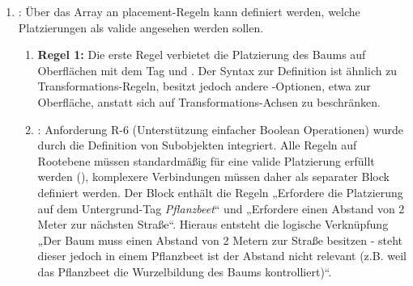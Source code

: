 \begin{enumerate}
\begin{enumerate}
        Schließlich kann über die Attribute  und  eine Begründung hinzugefügt werden. Ein zentraler Aspekt der Regelsyntax sind , welche modular zu einem zusammenhängenden Satz kombiniert werden können. Die atomaren Fehler müssen hierbei im Format  formatiert werden, z.B.  und . Bei mehreren auftretenden Fehlern können diese einzelnen atomaren Fehler schließlich zu einer vollständigen Information zusammengefügt werden, z.B. . Alternativ können über den  auch  definiert werden, falls keine Kombination gewünscht ist.
        \item \textbf{Regel 3}: Die dritte Regel definiert zusätzlich eine Einschränkung der Skalierung zwischen 0,5x und 1,5x
    \end{enumerate}
    \item {}: Über das Array an placement-Regeln kann definiert werden, welche Platzierungen als valide angesehen werden sollen.
    \begin{enumerate}
        \item \textbf{Regel 1:} Die erste Regel verbietet die Platzierung des Baums auf Oberflächen mit dem Tag  und . Der Syntax zur Definition ist ähnlich zu Transformations-Regeln, besitzt jedoch andere -Optionen, etwa zur Oberfläche, anstatt sich auf Transformations-Achsen zu beschränken.
        \item {}: Anforderung R-6 (Unterstützung einfacher Boolean Operationen) wurde durch die Definition von Subobjekten integriert. Alle Regeln auf Rootebene müssen standardmäßig für eine valide Platzierung erfüllt werden (), komplexere Verbindungen müssen daher als separater Block definiert werden.
        Der Block enthält die Regeln „Erfordere die Platzierung auf dem Untergrund-Tag \textit{Pflanzbeet}“ und „Erfordere einen Abstand von 2 Meter zur nächsten Straße“. Hieraus entsteht die logische Verknüpfung „Der Baum muss einen Abstand von 2 Metern zur Straße besitzen - steht dieser jedoch in einem Pflanzbeet ist der Abstand nicht relevant (z.B. weil das Pflanzbeet die Wurzelbildung des Baums kontrolliert)“.
    \end{enumerate}
\end{enumerate}

